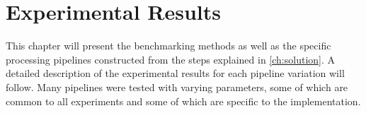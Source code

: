 \chapter{Experimental Results}\label{ch:results}

This chapter will present the benchmarking methods as well as the specific
processing pipelines constructed from the steps explained in
\autoref{ch:solution}. A detailed description of the experimental results for
each pipeline variation will follow. Many pipelines were tested with varying
parameters, some of which are common to all experiments and some of which are
specific to the implementation.




